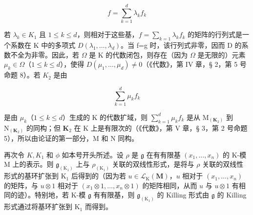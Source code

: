 \[
f = \sum_ {k = 1} ^ {d} \lambda_ {k} f _ {k}
\]

若 \(\lambda_{k}\in K_{1}\) 且 \(1\leqslant k\leqslant d\)，则相对于这些基，\(f=\sum_{k=1}\lambda_{k}f_{k}\) 的矩阵的行列式是一个系数在 K 中的多项式 \(D(\lambda_{1},\ldots,\lambda_{d})\)。当 f=g 时，该行列式非零，因而 D 的系数不全为非零。因此，若 \(\Omega\) 是 K 的代数闭包，则存在（因为 \(\Omega\) 是无限的）元素 \(\mu_{k}\in\Omega\)（\(1\leqslant k\leqslant d\)），使得 \(D(\mu_{1},\ldots,\mu_{d})\neq0\)（《代数》，第 IV 章，§ 2，第 5 号命题 8）。若 \(K_{2}\) 是由

\[
\sum_ {k = 1} ^ {d} \mu_ {k} f _ {k}
\]

是由 \(\mu_{k}\)（\(1 \leqslant k \leqslant d\)）生成的 K 的代数扩域，则 \(\sum_{k=1}^{d} \mu_{k} f_{k}\) 是从 \(\mathrm{M}_{(\mathbf{K}_{2})}\) 到 \(\mathrm{N}_{(\mathbf{K}_{2})}\) 的同构；但 \(\mathbf{K}_{2}\) 在 K 上是有限次的（《代数》，第 V 章，§ 3，第 2 号命题 5），所以由论证的第一部分，M 和 N 同构。

再次令 \(K, K_{1}\) 和 \(\phi\) 如本号开头所述。设 \(\rho\) 是 \(\mathfrak{g}\) 在有有限基 \((x_{1},\ldots ,x_{n})\) 的 K-模 M 上的表示。则 \(\mathfrak{g}_{(\mathrm{K}_1)}\) 上与 \(\rho_{(\mathrm{K}_1)}\) 关联的双线性形式，是将与 \(\rho\) 关联的双线性形式的基环扩张到 \(\mathrm{K}_1\) 后得到的（因为若 \(u\in \mathcal{L}_{\mathrm{K}}(\mathbf{M})\)，\(u\) 相对于 \((x_{1},\dots,x_{n})\) 的矩阵，与 \(u\otimes 1\) 相对于 \((x_{1}\otimes 1,\dots,x_{n}\otimes 1)\) 的矩阵相同，从而 \(u\) 与 \(u\otimes 1\) 有相同的迹）。特别地，若 K-模 \(\mathfrak{g}\) 有有限基，则 \(\mathfrak{g}_{(\mathrm{K}_1)}\) 的 Killing 形式由 \(\mathfrak{g}\) 的 Killing 形式通过将基环扩张到 \(\mathrm{K}_1\) 而得到。


